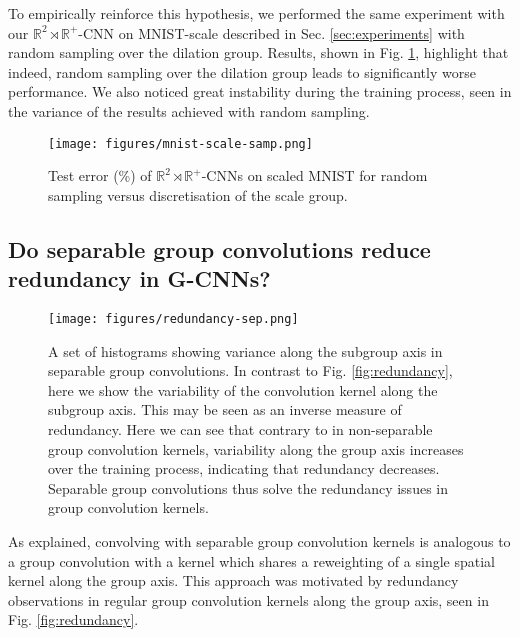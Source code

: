 \documentclass[nohyperref]{article}
\theoremstyle{plain}
\theoremstyle{definition}
\theoremstyle{remark}
\newcommand{\R}{\mathbb{R}}
\begin{document}
To empirically reinforce this hypothesis, we performed the same experiment with our $\R^2 \rtimes \R^+$-CNN on MNIST-scale described in Sec.  \ref{sec:experiments} with random sampling over the dilation group. Results, shown in Fig. \ref{fig:samplingscaledmnist}, highlight that indeed, random sampling over the dilation group leads to significantly worse performance. We also noticed great instability during the training process, seen in the variance of the results achieved with random sampling.

\begin{figure}
\centering
  \texttt{[image: figures/mnist-scale-samp.png]}
  \caption{Test error (\%) of $\mathbb{R}^2\rtimes \R^+$-CNNs on scaled MNIST for random sampling versus discretisation of the scale group.}
  \label{fig:samplingscaledmnist}
\end{figure}

\subsection{Do separable group convolutions reduce redundancy in G-CNNs?}
\begin{figure}
\begin{center}
\texttt{[image: figures/redundancy-sep.png]}
\end{center}
\vspace{-2mm}
\caption{A set of histograms showing variance along the subgroup axis in separable group convolutions. In contrast to Fig. \ref{fig:redundancy}, here we show the variability of the convolution kernel along the subgroup axis. This may be seen as an inverse measure of redundancy. Here we can see that contrary to in non-separable group convolution kernels, variability along the group axis increases over the training process, indicating that redundancy decreases. Separable group convolutions thus solve the redundancy issues in group convolution kernels.
\vspace{-2mm}}
\label{fig:redundancy-sep}
\end{figure}
As explained, convolving with separable group convolution kernels is analogous to a group convolution with a kernel which shares a reweighting of a single spatial kernel along the group axis. This approach was motivated by redundancy observations in regular group convolution kernels along the group axis, seen in Fig. \ref{fig:redundancy}.
\end{document}
